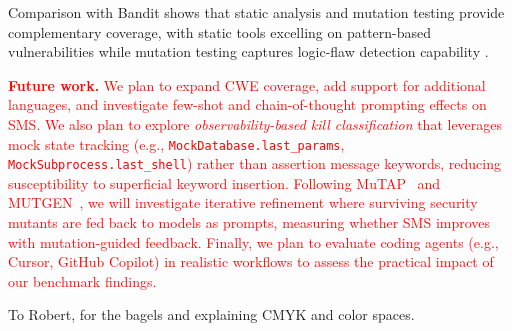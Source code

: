\documentclass[sigconf,anonymous,review]{acmart}
\begin{document}
Comparison with Bandit shows that static analysis and mutation testing provide complementary coverage, with static tools excelling on pattern-based vulnerabilities  while mutation testing captures logic-flaw detection capability .


\textcolor{red}{
\textbf{Future work.} We plan to expand CWE coverage, add support for additional languages, and investigate few-shot and chain-of-thought prompting effects on SMS. We also plan to explore \emph{observability-based kill classification} that leverages mock state tracking (e.g., \texttt{MockDatabase.last\_params}, \texttt{MockSubprocess.last\_shell}) rather than assertion message keywords, reducing susceptibility to superficial keyword insertion. Following MuTAP~\cite{dakhel2023mutap} and MUTGEN~\cite{mutgen2025}, we will investigate iterative refinement where surviving security mutants are fed back to models as prompts, measuring whether SMS improves with mutation-guided feedback. Finally, we plan to evaluate coding agents (e.g., Cursor, GitHub Copilot) in realistic workflows to assess the practical impact of our benchmark findings.
}


\begin{acks}
To Robert, for the bagels and explaining CMYK and color spaces.
\end{acks}





\appendix
\end{document}
